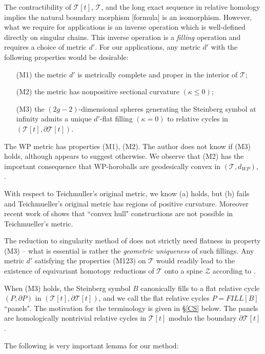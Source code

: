 \documentclass[12pt]{amsart}
\theoremstyle{definition}
\theoremstyle{remark}
\newcommand{\del}{\partial}
\newcommand{\sT}{\mathscr{T}}
\newcommand{\sZ}{\mathscr{Z}}
\begin{document}
The contractibility of $\sT[t]$, $\sT$, and the long exact sequence in relative homology implies the natural boundary morphism [formula] is an isomorphism. However, what we require for applications is an inverse operation which is well-defined directly on singular chains. This inverse operation is a \emph{filling} operation and requires a choice of metric $d'$. For our applications, any metric $d'$ with the following properties would be desirable:
\begin{itemize}
\item[(M1)] the metric $d'$ is metrically complete and proper in the interior of $\sT$;
\item[(M2)] the metric has nonpositive sectional curvature $(\kappa \leq 0)$;
\item[(M3)] the $(2g-2)$-dimensional spheres generating the Steinberg symbol at infinity admits a unique $d'$-flat filling $(\kappa =0)$ to relative cycles in $(\sT[t], \del \sT[t])$.
\end{itemize}

The WP metric has properties (M1), (M2). The author does not know if (M3) holds, although \cite{FarbRank} appears to suggest otherwise. We observe that (M2) has the important consequence that WP-horoballs are geodesically convex in $(\sT, d_{WP})$, \cite{GroCurv}.

With respect to Teichmuller's original metric, we know (a) holds, but (b) fails and Teichmueller's original metric has regions of positive curvature. Moreover recent work of \cite{RafiBourque} shows that ``convex hull" constructions are not possible in Teichmueller's metric.

The reduction to singularity method of \cite{martel} does not strictly need flatness in property (M3) -- what is essential is rather the \emph{geometric uniqueness} of such fillings. Any metric $d'$ satisfying the properties (M123) on $\sT$ would readily lead to the existence of equivariant homotopy reductions of $\sT$ onto a spine $\sZ$ according to \cite{martel}. 

When (M3) holds, the Steinberg symbol $B$ canonically fills to a flat relative cycle $(P, \del P)$ in $(\sT[t], \del \sT[t])$, and we call the flat relative cycles $P=FILL[B]$ ``panels". The motivation for the terminology is given in \S \eqref{CS} below. The panels are homologically nontrivial relative cycles in $\sT[t]$ modulo the boundary $\del \sT[t]$. 

The following is very important lemma for our method:
\end{document}
